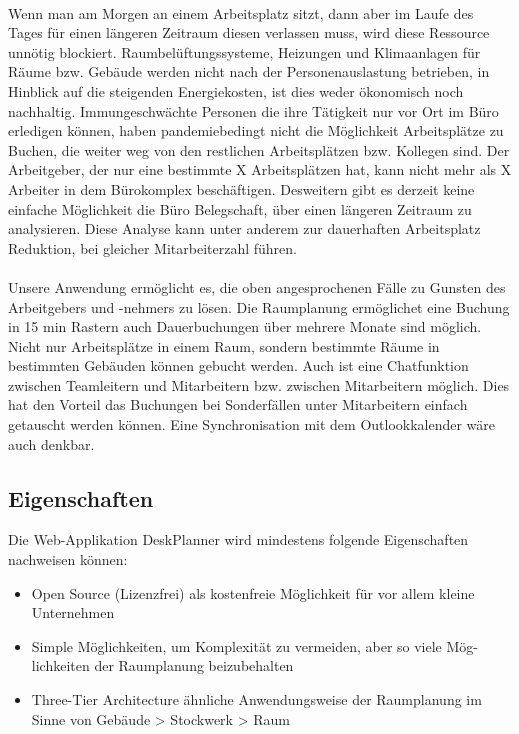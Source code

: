 \paragraph{} Wenn man am Morgen an einem Arbeitsplatz sitzt, dann aber im Laufe des Tages für einen längeren Zeitraum diesen verlassen muss, wird diese Ressource unnötig blockiert.
Raumbelüftungssysteme, Heizungen und Klimaanlagen für Räume bzw. Gebäude werden nicht nach der Personenauslastung betrieben, in Hinblick auf die steigenden Energiekosten, ist dies weder ökonomisch noch nachhaltig.
Immungeschwächte Personen die ihre Tätigkeit nur vor Ort im Büro erledigen können, haben pandemiebedingt nicht die Möglichkeit Arbeitsplätze zu Buchen, die weiter weg von den restlichen Arbeitsplätzen bzw. Kollegen sind. 
Der Arbeitgeber, der nur eine bestimmte X Arbeitsplätzen hat, kann nicht mehr als X Arbeiter in dem Bürokomplex beschäftigen. 
Desweitern gibt es derzeit keine einfache Möglichkeit die Büro Belegschaft, über einen längeren Zeitraum zu analysieren. 
Diese Analyse kann unter anderem zur dauerhaften Arbeitsplatz Reduktion, bei gleicher Mitarbeiterzahl führen.

\paragraph{} Unsere Anwendung ermöglicht es, die oben angesprochenen Fälle zu Gunsten des Arbeitgebers und -nehmers zu lösen.
Die Raumplanung ermöglichet eine Buchung in 15 min Rastern auch Dauerbuchungen über mehrere Monate sind möglich.
Nicht nur Arbeitsplätze in einem Raum, sondern bestimmte Räume in bestimmten Gebäuden können gebucht werden.
Auch ist eine Chatfunktion zwischen Teamleitern und Mitarbeitern bzw. zwischen Mitarbeitern möglich.
Dies hat den Vorteil das Buchungen bei Sonderfällen unter Mitarbeitern einfach getauscht werden können.
Eine Synchronisation mit dem Outlookkalender wäre auch denkbar.

\subsection{Eigenschaften}
Die Web-Applikation DeskPlanner wird mindestens folgende Eigenschaften \\nachweisen können:

\begin{itemize}
    \item Open Source (Lizenzfrei) als kostenfreie Möglichkeit für vor allem kleine Unternehmen
    \item Simple Möglichkeiten, um Komplexität zu vermeiden, aber so viele Mög-lichkeiten der Raumplanung beizubehalten
    \item Three-Tier Architecture ähnliche Anwendungsweise der Raumplanung im Sinne von Gebäude > Stockwerk > Raum 
\end{itemize}

